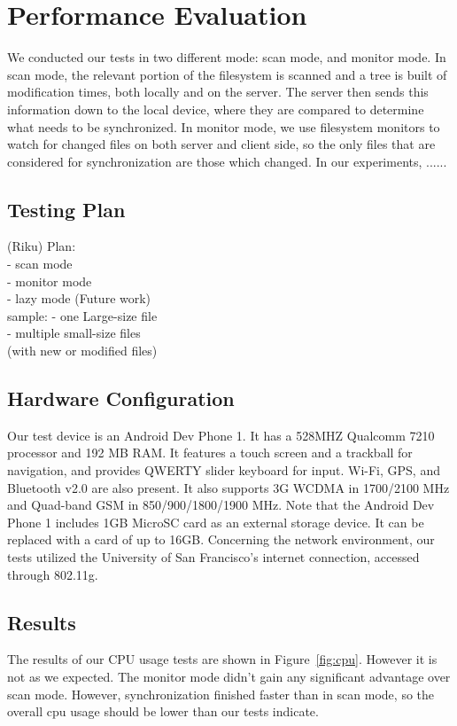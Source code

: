 \section{Performance Evaluation}
\label{sec:Performance}

We conducted our tests in two different mode: scan mode, and monitor mode. In scan mode, the relevant portion of the filesystem is scanned and a tree is built of modification times, both locally and on the server.  The server then sends this information down to the local device, where they are compared to determine what needs to be synchronized. In monitor mode, we use filesystem monitors to watch for changed files on both server and client side, so the only files that are considered for synchronization are those which changed. 
In our experiments, ......


\subsection{Testing Plan}
(Riku)
Plan:\\
	- scan mode\\
	- monitor mode\\
	- lazy mode (Future work)\\
	
	sample:	
		- one Large-size file\\
		- multiple small-size files\\
		(with new or modified files)\\
				
\subsection{Hardware Configuration}
Our test device is an Android Dev Phone 1. It has a 528MHZ Qualcomm 7210 processor and 192 MB RAM. It features a touch screen and a trackball for navigation, and provides QWERTY slider keyboard for input. Wi-Fi, GPS, and Bluetooth v2.0 are also present. It also supports 3G WCDMA in 1700/2100 MHz and Quad-band GSM in 850/900/1800/1900 MHz. Note that the Android Dev Phone 1 includes 1GB MicroSC card as an external storage device. It can be replaced with a card of up to 16GB. Concerning the network environment, our tests utilized the University of San Francisco's internet connection, accessed through 802.11g.

\subsection{Results}
The results of our CPU usage tests are shown in Figure~\ref{fig:cpu}. However it is not as we expected. The monitor mode didn't gain any significant advantage over scan mode. However, synchronization finished faster than in scan mode, so the overall cpu usage should be lower than our tests indicate.

